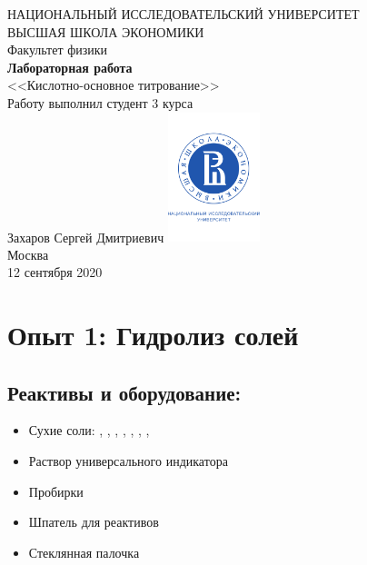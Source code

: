 \documentclass[a4paper, 12pt]{article}
\begin{document}
	\begin{titlepage}
		\begin{center}
			$$$$
			$$$$
			$$$$
			$$$$
			{\Large{НАЦИОНАЛЬНЫЙ ИССЛЕДОВАТЕЛЬСКИЙ УНИВЕРСИТЕТ}}\\
			\vspace{0.1cm}
			{\Large{ВЫСШАЯ ШКОЛА ЭКОНОМИКИ}}\\
			\vspace{0.25cm}
			{\large{Факультет физики}}\\
			\vspace{5.5cm}
			{\Huge\textbf{{Лабораторная работа}}}\\%
			\vspace{1cm}
			{\LARGE{<<Кислотно-основное титрование>>}}\\%
			\vspace{2cm}
			{Работу выполнил студент 3 курса}\\
			{Захаров Сергей Дмитриевич}
			\vfill
			\includegraphics[width = 0.2\textwidth]{HSElogo}\\
			\vfill
			Москва\\
			12 сентября 2020
		\end{center}
	\end{titlepage}

\tableofcontents

\newpage

\section{Опыт 1: Гидролиз солей}

\subsection{Реактивы и оборудование:}

\begin{itemize}
	\item Сухие соли: , , , , , , , 
	
	\item Раствор универсального индикатора
	
	\item Пробирки
	
	\item Шпатель для реактивов
	
	\item Стеклянная палочка
\end{itemize}
\end{document}
